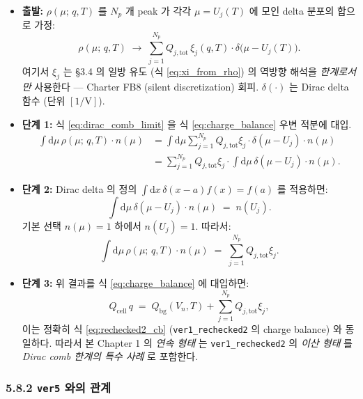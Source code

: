 \documentclass[11pt,a4paper]{article}
\newcommand{\dd}{\mathrm{d}}
\newcommand{\tot}{\mathrm{tot}}
\newcommand{\bg}{\mathrm{bg}}
\newcommand{\cell}{\mathrm{cell}}
\newcommand{\mucont}{\mu}
\newcommand{\rhomu}{\rho(\mucont;\, q, T)}
\newcommand{\nmu}{n(\mucont)}
\begin{document}
\begin{itemize}
\item \textbf{출발:} $\rhomu$ 를 $N_p$ 개 peak 가 각각 $\mucont = U_j(T)$ 에 모인
      delta 분포의 합으로 가정:
      \begin{equation}
      \rhomu \;\to\;
      \sum_{j=1}^{N_p} Q_{j,\tot}\, \xi_j(q, T) \cdot \delta\bigl(\mucont - U_j(T)\bigr).
      \label{eq:dirac_comb_limit}
      \end{equation}
      여기서 $\xi_j$ 는 \S 3.4 의 일방 유도 (식 \eqref{eq:xi_from_rho}) 의 역방향
      해석을 \emph{한계로서만} 사용한다 — Charter FB8 (silent discretization) 회피.
      $\delta(\cdot)$ 는 Dirac delta 함수 (단위 $[1/\mathrm{V}]$).
\item \textbf{단계 1:} 식 \eqref{eq:dirac_comb_limit} 을 식
      \eqref{eq:charge_balance} 우변 적분에 대입.
      \begin{align*}
      \int \dd\mucont\,\rhomu\cdot\nmu
      &= \int \dd\mucont \sum_{j=1}^{N_p}
         Q_{j,\tot}\xi_j \cdot \delta(\mucont - U_j) \cdot \nmu \\
      &= \sum_{j=1}^{N_p} Q_{j,\tot}\xi_j
         \cdot \int \dd\mucont\,\delta(\mucont - U_j) \cdot \nmu .
      \end{align*}
\item \textbf{단계 2:} Dirac delta 의 정의 $\int \dd x \, \delta(x - a) f(x) = f(a)$
      를 적용하면:
      \begin{equation*}
      \int \dd\mucont\,\delta(\mucont - U_j) \cdot \nmu \;=\; n(U_j).
      \end{equation*}
      기본 선택 $\nmu = 1$ 하에서 $n(U_j) = 1$. 따라서:
      \begin{equation*}
      \int \dd\mucont\,\rhomu\cdot\nmu \;=\; \sum_{j=1}^{N_p} Q_{j,\tot}\xi_j.
      \end{equation*}
\item \textbf{단계 3:} 위 결과를 식 \eqref{eq:charge_balance} 에 대입하면:
      \begin{equation}
      Q_{\cell}\, q \;=\; Q_{\bg}(V_n, T) + \sum_{j=1}^{N_p} Q_{j,\tot}\xi_j,
      \end{equation}
      이는 정확히 식 \eqref{eq:rechecked2_cb} (\texttt{ver1\_rechecked2} 의 charge
      balance) 와 동일하다. 따라서 본 Chapter 1 의 \emph{연속 형태} 는
      \texttt{ver1\_rechecked2} 의 \emph{이산 형태} 를 \emph{Dirac comb 한계의
      특수 사례} 로 포함한다.
\end{itemize}

\subsubsection*{5.8.2 \texttt{ver5} 와의 관계}
\end{document}
